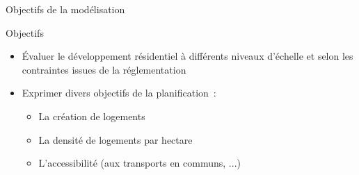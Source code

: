 \documentclass[xcolor=table]{beamer}
\begin{document}
\begin{frame}{Objectifs de la modélisation}
  \begin{block}{Objectifs}
	\begin{itemize}
		\footnotesize
		\item<1-> Évaluer le développement résidentiel à différents niveaux d'échelle et selon les contraintes issues de la réglementation
		\item<2-> Exprimer divers objectifs de la planification~: %
		\begin{itemize}
			\scriptsize
			\item<3-> La création de logements
			\item<4-> La densité de logements par hectare
			\item<5-> L'accessibilité (aux transports en communs, ...)
		\end{itemize}
		\end{itemize}
	\end{block}
\end{frame}
\end{document}
